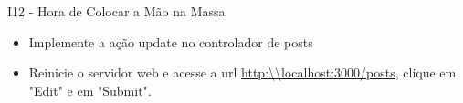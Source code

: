 \begin{frame}[t, fragile]{I12 - Hora de Colocar a Mão na Massa}
	\begin{itemize}
		\item Implemente a ação \alert{update} no controlador de posts
		\item Reinicie o servidor web e acesse a url \url{http:\\localhost:3000/posts}, clique em \alert{"Edit"} e em \alert{"Submit"}.
	\end{itemize}
\end{frame}